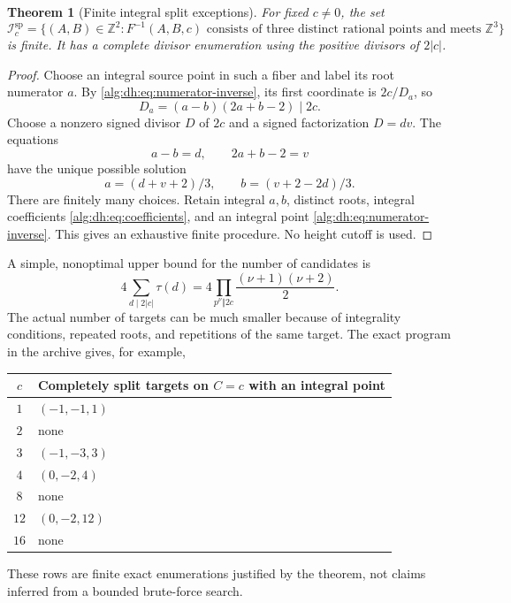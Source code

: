 \documentclass[11pt]{article}
\numberwithin{equation}{section}
\newtheorem{theorem}{Theorem}[section]
\theoremstyle{plain}
\theoremstyle{plain}
\theoremstyle{plain}
\theoremstyle{definition}
\theoremstyle{definition}
\theoremstyle{definition}
\theoremstyle{remark}
\newcommand{\Z}{\mathbb Z}\newcommand{\Q}{\mathbb Q}
\newcommand{\Isplit}{\mathcal I^{\mathrm{sp}}}
\begin{document}
\begin{theorem}[Finite integral split exceptions]\label{alg:dh:thm:finite}
For fixed $c\ne0$, the set
\[
 \Isplit_c=\{(A,B)\in\Z^2:
 F^{-1}(A,B,c)\text{ consists of three distinct rational points and
 meets }\Z^3\}
\]
is finite. It has a complete divisor enumeration using the positive
divisors of $2|c|$.
\end{theorem}
\begin{proof}
Choose an integral source point in such a fiber and label its root
numerator $a$. By \eqref{alg:dh:eq:numerator-inverse}, its first coordinate is
$2c/D_a$, so
\begin{equation}\label{alg:dh:eq:D-divides}
 D_a=(a-b)(2a+b-2)\mid2c.
\end{equation}
Choose a nonzero signed divisor $D$ of $2c$ and a signed factorization
$D=dv$. The equations
\[
 a-b=d,\qquad 2a+b-2=v
\]
have the unique possible solution
\begin{equation}\label{alg:dh:eq:exception-parameters}
 a=(d+v+2)/3,\qquad b=(v+2-2d)/3.
\end{equation}
There are finitely many choices. Retain integral $a,b$, distinct roots,
integral coefficients \eqref{alg:dh:eq:coefficients}, and an integral point
\eqref{alg:dh:eq:numerator-inverse}. This gives an exhaustive finite procedure.
No height cutoff is used.
\end{proof}

A simple, nonoptimal upper bound for the number of candidates is
\begin{equation}\label{alg:dh:eq:exception-bound}
 4\sum_{d\mid2|c|}\tau(d)
 =4\prod_{p^\nu\Vert2c}\frac{(\nu+1)(\nu+2)}2.
\end{equation}
The actual number of targets can be much smaller because of integrality
conditions, repeated roots, and repetitions of the same target.
The exact program in the archive gives, for example,
\begin{center}
\begin{tabular}{c l}
\toprule
$c$ & Completely split targets on $C=c$ with an integral point\\
\midrule
$1$ & $(-1,-1,1)$\\
$2$ & none\\
$3$ & $(-1,-3,3)$\\
$4$ & $(0,-2,4)$\\
$8$ & none\\
$12$ & $(0,-2,12)$\\
$16$ & none\\
\bottomrule
\end{tabular}
\end{center}
These rows are finite exact enumerations justified by the theorem, not
claims inferred from a bounded brute-force search.
\end{document}
